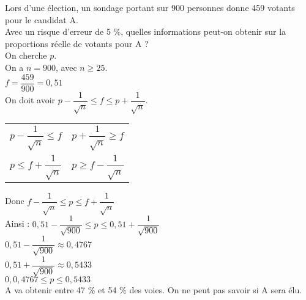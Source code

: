 Lors d'une élection, un sondage portant sur 900 personnes donne 459 votants pour le candidat A. \\ Avec un risque d'erreur de 5  \%, quelles informations peut-on obtenir sur la proportions réelle de votants pour A ? \\

On cherche $p$. \\

On a $n = 900 $, avec $ n \geq 25 $. \\

$ f = \dfrac{459}{900} = 0,51 $ \\

On doit avoir $ p - \dfrac{1}{\sqrt{n}} \leq f \leq p + \dfrac{1}{\sqrt{n}} $.

\vspace*{.3cm}

\begin{tabular}{ll}
$ p - \dfrac{1}{\sqrt{n}} \leq f $ & $ p + \dfrac{1}{\sqrt{n}} \geq f $ \\
$ p \leq f + \dfrac{1}{\sqrt{n}}$ & $ p \geq f - \dfrac{1}{\sqrt{n}}$ \\
\end{tabular}

\vspace{.3cm}

Donc $ f - \dfrac{1}{\sqrt{n}} \leq p \leq f + \dfrac{1}{\sqrt{n}} $ \\

Ainsi : $ 0,51 - \dfrac{1}{\sqrt{900}} \leq p \leq 0,51 + \dfrac{1}{\sqrt{900}} $ \\

$ 0,51 - \dfrac{1}{\sqrt{900}} \approx 0,4767 $ \\

$ 0,51 + \dfrac{1}{\sqrt{900}} \approx 0,5433 $ \\

$ 0,0,4767 \leq p \leq 0,5433 $ \\

A va obtenir entre 47  \% et 54  \% des voies. On ne peut pas savoir si A sera élu.
